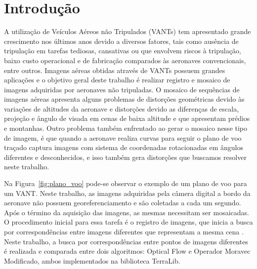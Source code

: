 \documentclass[9pt, a4paper, nofonttune, journal]{IEEEtran}
\begin{document}
\section{Introdução}
A utilização de Veículos Aéreos não Tripulados (VANTs) tem apresentado grande crescimento nos últimos anos devido a diversos fatores, tais como ausência de tripulação em tarefas tediosas, cansativas ou que envolvem riscos à tripulação, baixo custo operacional e de fabricação comparados às aeronaves convencionais, entre outros. Imagens aéreas obtidas através de VANTs possuem grandes aplicações \cite{Canhoto} e o objetivo geral deste trabalho é realizar registro e mosaico de imagens adquiridas por aeronaves não tripuladas. O mosaico de sequências de imagens aéreas apresenta alguns problemas de distorções geométricas devido às variações de altitudes da aeronave e distorções devido as diferenças de escala, projeção e ângulo de visada em cenas de baixa altitude e que apresentam prédios e montanhas. Outro problema também enfrentado ao gerar o mosaico nesse tipo de imagem, é que quando a aeronave realiza curvas para seguir o plano de voo traçado captura imagens com sistema de coordenadas rotacionadas em ângulos diferentes e desconhecidos, e isso também gera distorções que buscamos resolver neste trabalho.

Na Figura~\ref{fig:plano_voo} pode-se observar o exemplo de um plano de voo para um VANT. Neste trabalho, as imagens adquiridas pela câmera digital a bordo da aeronave não possuem georeferenciamento e são coletadas a cada um segundo. Após o término da aquisição das imagens, as mesmas necessitam ser mosaicadas. O procedimento inicial para essa tarefa é o registro de imagens, que inicia a busca por correspondências entre imagens diferentes que representam a mesma cena \cite{Fonseca:1999:ReAuIm}. Neste trabalho, a busca por correspondências entre pontos de imagens diferentes é realizada e comparada entre dois algoritmos: Optical Flow e Operador Moravec Modificado, ambos implementados na biblioteca TerraLib.
\end{document}
